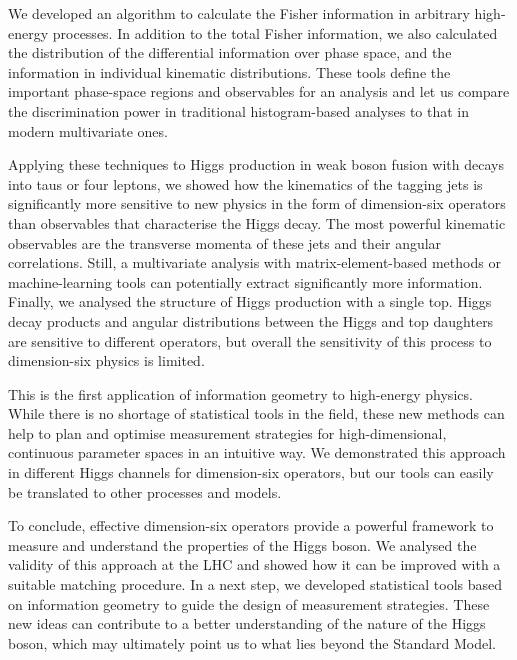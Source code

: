 We developed an algorithm to calculate the Fisher information in
arbitrary high-energy processes. In addition to the total Fisher
information, we also calculated the distribution of the differential
information over phase space, and the information in individual
kinematic distributions. These tools define the important phase-space
regions and observables for an analysis and let us compare the
discrimination power in traditional histogram-based analyses to that
in modern multivariate ones.

Applying these techniques to Higgs production in weak boson fusion
with decays into taus or four leptons, we showed how the kinematics of
the tagging jets is significantly more sensitive to new physics in the
form of dimension-six operators than observables that characterise the
Higgs decay. The most powerful kinematic observables are the
transverse momenta of these jets and their angular correlations. Still, a
multivariate analysis with matrix-element-based methods or
machine-learning tools can potentially extract significantly more
information. Finally, we analysed the structure of Higgs production
with a single top. Higgs decay products and angular distributions
between the Higgs and top daughters are sensitive to different
operators, but overall the sensitivity of this process to
dimension-six physics is limited.

This is the first application of information geometry to high-energy
physics. While there is no shortage of statistical tools in the field,
these new methods can help to plan and optimise measurement strategies
for high-dimensional, continuous parameter spaces in an intuitive
way. We demonstrated this approach in different Higgs channels for
dimension-six operators, but our tools can easily be translated to
other processes and models.

\newparagraph
%
To conclude, effective dimension-six operators provide a powerful
framework to measure and understand the properties of the Higgs
boson. We analysed the validity of this approach at the LHC and showed
how it can be improved with a suitable matching procedure. In a next
step, we developed statistical tools based on information geometry to
guide the design of measurement strategies. These new ideas can
contribute to a better understanding of the nature of the Higgs boson,
which may ultimately point us to what lies beyond the Standard Model.
